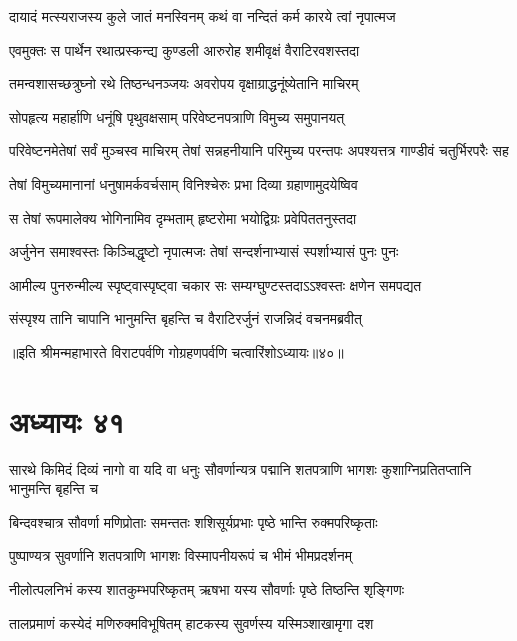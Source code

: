 \twolineshloka
{दायादं मत्स्यराजस्य कुले जातं मनस्विनम्}
{कथं वा नन्दितं कर्म कारये त्वां नृपात्मज}



\twolineshloka
{एवमुक्तः स पार्थेन रथात्प्रस्कन्द्य कुण्डली}
{आरुरोह शमीवृक्षं वैराटिरवशस्तदा}


\twolineshloka
{तमन्वशासच्छत्रुघ्नो रथे तिष्ठन्धनञ्जयः}
{अवरोपय वृक्षाग्राद्धनूंष्येतानि माचिरम्}


\twolineshloka
{सोपहृत्य महार्हाणि धनूंषि पृथुवक्षसाम्}
{परिवेष्टनपत्राणि विमुच्य समुपानयत्}


\threelineshloka
{परिवेष्टनमेतेषां सर्वं मुञ्चस्व माचिरम्}
{तेषां सन्नहनीयानि परिमुच्य परन्तपः}
{अपश्यत्तत्र गाण्डीवं चतुर्भिरपरैः सह}


\twolineshloka
{तेषां विमुच्यमानानां धनुषामर्कवर्चसाम्}
{विनिश्चेरुः प्रभा दिव्या ग्रहाणामुदयेष्विव}


\twolineshloka
{स तेषां रूपमालेक्य भोगिनामिव दृम्भताम्}
{हृष्टरोमा भयोद्विग्रः प्रवेपिततनुस्तदा}


\twolineshloka
{अर्जुनेन समाश्वस्तः किञ्चिद्धृष्टो नृपात्मजः}
{तेषां सन्दर्शनाभ्यासं स्पर्शाभ्यासं पुनः पुनः}


\twolineshloka
{आमील्य पुनरुन्मील्य स्पृष्ट्वास्पृष्ट्वा चकार सः}
{सम्यग्घुण्टस्तदाऽऽश्वस्तः क्षणेन समपद्यत}


\twolineshloka
{संस्पृश्य तानि चापानि भानुमन्ति बृहन्ति च}
{वैराटिरर्जुनं राजन्निदं वचनमब्रवीत्}

॥इति श्रीमन्महाभारते विराटपर्वणि गोग्रहणपर्वणि चत्वारिंशोऽध्यायः॥४०॥

\chapter{अध्यायः ४१}

\threelineshloka
{सारथे किमिदं दिव्यं नागो वा यदि वा धनुः}
{सौवर्णान्यत्र पद्मानि शतपत्राणि भागशः}
{कुशाग्निप्रतितप्तानि भानुमन्ति बृहन्ति च}


\twolineshloka
{बिन्दवश्चात्र सौवर्णा मणिप्रोताः समन्ततः}
{शशिसूर्यप्रभाः पृष्ठे भान्ति रुक्मपरिष्कृताः}


\twolineshloka
{पुष्पाण्यत्र सुवर्णानि शतपत्राणि भागशः}
{विस्मापनीयरूपं च भीमं भीमप्रदर्शनम्}


\twolineshloka
{नीलोत्पलनिभं कस्य शातकुम्भपरिष्कृतम्}
{ऋषभा यस्य सौवर्णाः पृष्ठे तिष्ठन्ति शृङ्गिणः}


\twolineshloka
{तालप्रमाणं कस्येदं मणिरुक्मविभूषितम्}
{हाटकस्य सुवर्णस्य यस्मिञ्शाखामृगा दश}

